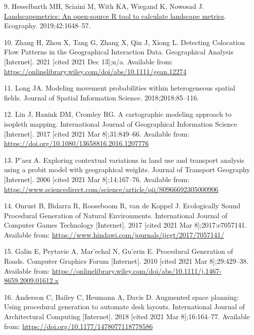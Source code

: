 \documentclass{josis}
\newlength{\cslhangindent}
\newenvironment{CSLReferences}[2] %
 {%
  \setlength{\parindent}{0pt}
  \ifodd #1 \everypar{\setlength{\hangindent}{\cslhangindent}}\ignorespaces\fi
  \ifnum #2 > 0
  \setlength{\parskip}{#2\baselineskip}
  \fi
 }%
 {}
\begin{document}
\begin{CSLReferences}{0}{0}
\leavevmode{}%
9. Hesselbarth MH, Sciaini M, With KA, Wiegand K, Nowosad J. \href{https://doi.org/gf4n9j}{Landscapemetrics: An open-source {R} tool to calculate landscape metrics}. Ecography. 2019;42:1648--57.

\leavevmode{}%
10. Zhang H, Zhou X, Tang G, Zhang X, Qin J, Xiong L. Detecting {Colocation} {Flow} {Patterns} in the {Geographical} {Interaction} {Data}. Geographical Analysis {[}Internet{]}. 2021 {[}cited 2021 Dec 13{]};n/a. Available from: \url{https://onlinelibrary.wiley.com/doi/abs/10.1111/gean.12274}

\leavevmode{}%
11. Long JA. Modeling movement probabilities within heterogeneous spatial fields. Journal of Spatial Information Science. 2018;2018:85--116.

\leavevmode{}%
12. Lin J, Hanink DM, Cromley RG. A cartographic modeling approach to isopleth mapping. International Journal of Geographical Information Science {[}Internet{]}. 2017 {[}cited 2021 Mar 8{]};31:849--66. Available from: \url{https://doi.org/10.1080/13658816.2016.1207776}

\leavevmode{}%
13. P'aez A. Exploring contextual variations in land use and transport analysis using a probit model with geographical weights. Journal of Transport Geography {[}Internet{]}. 2006 {[}cited 2021 Mar 8{]};14:167--76. Available from: \url{https://www.sciencedirect.com/science/article/pii/S0966692305000906}

\leavevmode{}%
14. Onrust B, Bidarra R, Rooseboom R, van de Koppel J. Ecologically {Sound} {Procedural} {Generation} of {Natural} {Environments}. International Journal of Computer Games Technology {[}Internet{]}. 2017 {[}cited 2021 Mar 8{]};2017:e7057141. Available from: \url{https://www.hindawi.com/journals/ijcgt/2017/7057141/}

\leavevmode{}%
15. Galin E, Peytavie A, Mar'echal N, Gu'erin E. Procedural {Generation} of {Roads}. Computer Graphics Forum {[}Internet{]}. 2010 {[}cited 2021 Mar 8{]};29:429--38. Available from: \url{https://onlinelibrary.wiley.com/doi/abs/10.1111/j.1467-8659.2009.01612.x}

\leavevmode{}%
16. Anderson C, Bailey C, Heumann A, Davis D. Augmented space planning: {Using} procedural generation to automate desk layouts. International Journal of Architectural Computing {[}Internet{]}. 2018 {[}cited 2021 Mar 8{]};16:164--77. Available from: \url{https://doi.org/10.1177/1478077118778586}


\end{CSLReferences}
\end{document}
